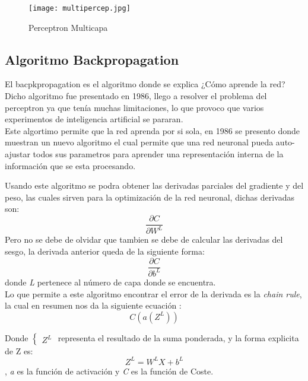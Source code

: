             \begin{figure}[H]
                \centering
                \texttt{[image: multipercep.jpg]}
                \caption{Perceptron Multicapa}
                \label{fig:fig8}
            \end{figure}

            
        \subsection{Algoritmo Backpropagation}
            El bacpkpropagation es el algoritmo donde se explica ¿C\'omo aprende la red?
            Dicho algoritmo fue presentado en 1986, llego a resolver el problema del perceptron 
            ya que ten\'ia muchas limitaciones, lo que provoco que varios experimentos de inteligencia
            artificial se pararan.\\

            Este algortimo permite que la red aprenda por si sola, en 1986 se presento \cite{rumelhart1986} 
            donde muestran un nuevo algoritmo el cual permite que una red neuronal pueda auto-ajustar todos sus 
            parametros para aprender una representaci\'on interna de la informaci\'on que se esta procesando.

            Usando este algoritmo se podra obtener las derivadas parciales del gradiente y del peso, las cuales
            sirven para la optimizaci\'on de la red neuronal, dichas derivadas son:
            \begin{equation*}
                \frac{\partial C}{\partial W^L}
            \end{equation*}
            Pero no se debe de olvidar que tambien se debe de calcular las derivadas del sesgo, la derivada anterior
            queda de la siguiente forma:
            \begin{equation*}
                \frac{\partial C}{\partial b^L}
            \end{equation*}
            donde \textit{L} pertenece al n\'umero de capa donde se encuentra. \\
            Lo que permite a este algoritmo encontrar el error de la derivada es la \textit{chain rule}, la cual en resumen 
            nos da la siguiente ecuaci\'on :
            \begin{equation*}
                C(a(Z^L))
            \end{equation*}

            Donde 
            $\begin{cases}
                Z^L
            \end{cases}$
            representa el resultado de la suma ponderada, y la forma explicita de Z es:
            \begin{equation*}
                Z^L = W^LX + b^L
            \end{equation*}
            , \textit{a} es la funci\'on de activaci\'on 
            y \textit{C} es la funci\'on de Coste.

